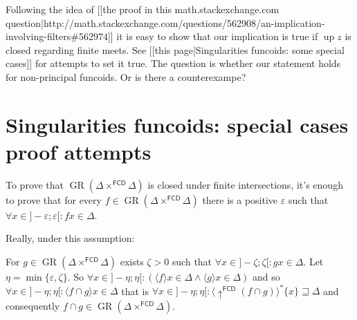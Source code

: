 Following the idea of [[the proof in this math.stackexchange.com question|http://math.stackexchange.com/questions/562908/an-implication-involving-filters\#562974]] it is easy to show that our implication is true if $\operatorname{up} z$ is closed regarding finite meets. See [[this page|Singularities funcoids: some special cases]] for attempts to set it true.
The question is whether our statement holds for non-principal funcoids. Or is there a counterexampe?

\section{Singularities funcoids: special cases proof attempts}
To prove that $\operatorname{GR} ( \Delta \times^{\mathsf{FCD}} \Delta)$ is closed under finite intersections, it's enough to prove that for every $f \in \operatorname{GR} ( \Delta \times^{\mathsf{FCD}} \Delta)$ there is a positive $\varepsilon$ such that $\forall x \in ] - \varepsilon ; \varepsilon[ : f x \in \Delta$.

Really, under this assumption:

For $g \in \operatorname{GR} ( \Delta \times^{\mathsf{FCD}} \Delta)$ exists $\zeta > 0$ such that $\forall x \in ] - \zeta ; \zeta[ : g x \in \Delta$. Let $\eta = \min \{ \varepsilon, \zeta \}$. So $\forall x \in ] - \eta ; \eta[ : ( \langle f \rangle x \in \Delta \wedge \langle g \rangle x \in \Delta)$ and so $\forall x \in ] - \eta ; \eta[ : \langle f \cap g \rangle x \in \Delta$ that is $\forall x \in ] - \eta ; \eta[ : \langle \uparrow^{\mathsf{FCD}} ( f \cap g) \rangle^{\ast} \{ x \} \sqsupseteq \Delta$ and consequently $f \cap g \in \operatorname{GR} ( \Delta \times^{\mathsf{FCD}} \Delta)$.
